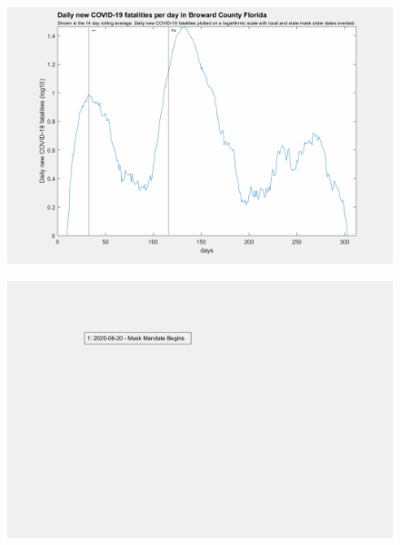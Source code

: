 \documentclass[]{article}
\begin{document}
\begin{figure}[!h]
	\includegraphics[width=\linewidth]{images/broward_mask_order_fatalities_log.png}
	\caption{}
	\label{fig:images/broward_mask_order_fatalities_logLabel}
\end{figure}

\begin{figure}[!h]
	\includegraphics[width=\linewidth]{legends/orange_mask_order_legend.png}
	\caption{}
	\label{fig:legends/orange_mask_order_legendLabel}
\end{figure}
\end{document}
